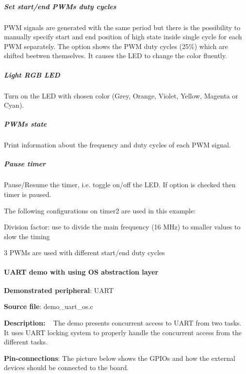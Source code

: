 \subparagraph*{Set start/end P\+W\+Ms duty cycles}

P\+W\+M signals are generated with the same period but there is the possibility to manually specify start and end position of high state inside single cycle for each P\+W\+M separately. The option shows the P\+W\+M duty cycles (25\%) which are shifted beetwen themselves. It causes the L\+E\+D to change the color fluently.

\subparagraph*{Light R\+G\+B L\+E\+D}

Turn on the L\+E\+D with chosen color (Grey, Orange, Violet, Yellow, Magenta or Cyan).

\subparagraph*{P\+W\+Ms state}

Print information about the frequency and duty cycles of each P\+W\+M signal.

\subparagraph*{Pause timer}

Pause/\+Resume the timer, i.\+e. toggle on/off the L\+E\+D. If option is checked then timer is paused.

The following configurations on timer2 are used in this example\+:
\begin{DoxyItemize}
\item Division factor\+: use to divide the main frequency (16 M\+Hz) to smaller values to slow the timing
\item 3 P\+W\+M\textquotesingle{}s are used with different start/end duty cycles
\end{DoxyItemize}

\paragraph*{U\+A\+R\+T demo with using O\+S abstraction layer}


\begin{DoxyItemize}
\item {\bfseries Demonstrated peripheral}\+: U\+A\+R\+T
\item {\bfseries Source file}\+: demo\+\_\+uart\+\_\+os.\+c
\item {\bfseries Description\+:} ~\newline
 The demo presents concurrent access to U\+A\+R\+T from two tasks. It uses U\+A\+R\+T locking system to properly handle the concurrent access from the different tasks.
\item {\bfseries Pin-\/connections}\+: The picture below shows the G\+P\+I\+Os and how the external devices should be connected to the board.
\end{DoxyItemize}


